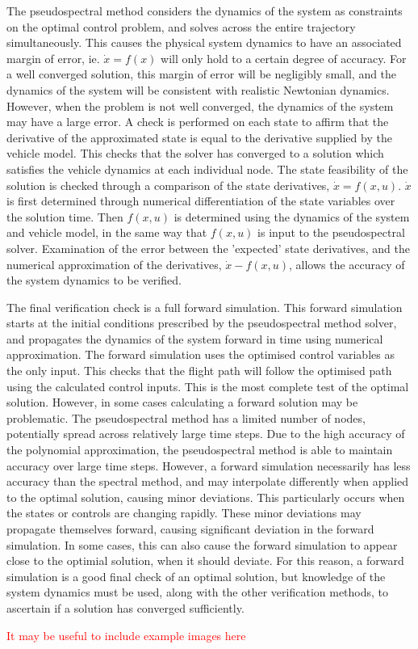 The pseudospectral method considers the dynamics of the system as constraints on the optimal control problem, and solves across the entire trajectory simultaneously. This causes the physical system dynamics to have an associated margin of error, ie. $\dot{x} = f(x)$ will only hold to a certain degree of accuracy. For a well converged solution, this margin of error will be negligibly small, and the dynamics of the system will be consistent with realistic Newtonian dynamics. However, when the problem is not well converged, the dynamics of the system may have a large error.
A check is performed on each state to affirm that the derivative of the approximated state is equal to the derivative supplied by the vehicle model. This checks that the solver has converged to a solution which satisfies the vehicle dynamics at each individual node. 
The state feasibility of the solution is checked through a comparison of the state derivatives, $\dot{x} = f(x,u)$. $\dot{x}$ is first determined through numerical differentiation of the state variables over the solution time. Then $f(x,u)$ is determined using the dynamics of the system and vehicle model, in the same way that $f(x,u)$ is input to the pseudospectral solver. Examination of the error between the 'expected' state derivatives, and the numerical approximation of the derivatives, $\dot{x} - f(x,u)$, allows the accuracy of the system dynamics to be verified. 



 The final verification check is a full forward simulation. This forward simulation starts at the initial conditions prescribed by the pseudospectral method solver, and propagates the dynamics of the system forward in time using numerical approximation. The forward simulation uses the optimised control variables as the only input. 
This checks that the flight path will follow the optimised path using the calculated control inputs. This is the most complete test of the optimal solution. However, in some cases calculating a forward solution may be problematic. The pseudospectral method has a limited number of nodes, potentially spread across relatively large time steps. Due to the high accuracy of the polynomial approximation, the pseudospectral method is able to maintain accuracy over large time steps. However, a forward simulation necessarily has less accuracy than the spectral method, and may interpolate differently when applied to the optimal solution, causing minor deviations. This particularly occurs when the states or controls are changing rapidly. These minor deviations may propagate themselves forward, causing significant deviation in the forward simulation. In some cases, this can also cause the forward simulation to appear close to the optimial solution, when it should deviate. For this reason, a forward simulation is a good final check of an optimal solution, but knowledge of the system dynamics must be used, along with the other verification methods, to ascertain if a solution has converged sufficiently. 

\textcolor{red}{It may be useful to include example images here}

